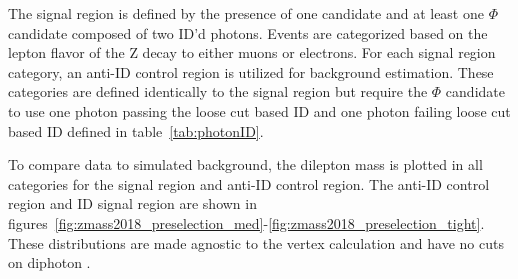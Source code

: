 The signal region is defined by the presence of one \VZ candidate and at least one $\Phi$ candidate composed of two ID'd photons. Events are categorized based on the lepton flavor of the Z decay to either muons or electrons. For each signal region category, an anti-ID control region is utilized for background estimation. These categories are defined identically to the signal region but require the $\Phi$ candidate to use one photon passing the loose cut based ID and one photon failing loose cut based ID defined in table~\ref{tab:photonID}.

To compare data to simulated background, the dilepton mass \mll is plotted in all categories for the signal region and anti-ID control region. The anti-ID control region and ID signal region are shown in figures~\ref{fig:zmass2018_preselection_med}-\ref{fig:zmass2018_preselection_tight}. These distributions are made agnostic to the vertex calculation and have no cuts on diphoton \lxy.


